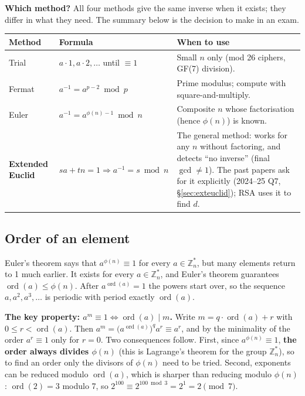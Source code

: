 \textbf{Which method?} All four methods give the same inverse when it exists; they differ in what they need. The summary below is the decision to make in an exam.
\begin{center}\small
\begin{tabularx}{\textwidth}{@{}l l X@{}}
\toprule
Method & Formula & When to use\\
\midrule
Trial & $a\cdot1, a\cdot2, \dots$ until $\equiv 1$ & Small $n$ only (mod 26 ciphers, GF(7) division).\\
Fermat & $a^{-1} = a^{p-2} \bmod p$ & Prime modulus; compute with square-and-multiply.\\
Euler & $a^{-1} = a^{\phi(n)-1} \bmod n$ & Composite $n$ whose factorisation (hence $\phi(n)$) is known.\\
\textbf{Extended Euclid} & $sa + tn = 1 \Rightarrow a^{-1} = s \bmod n$ & The general method: works for any $n$ without factoring, and detects ``no inverse'' (final $\gcd \ne 1$). The past papers ask for it explicitly (2024--25 Q7, \S\ref{sec:exteuclid}); RSA uses it to find $d$.\\
\bottomrule
\end{tabularx}
\end{center}

\subsection{Order of an element \new}
Euler's theorem says that $a^{\phi(n)} \equiv 1$ for every $a \in \mathbb{Z}_n^*$, but many elements return to 1 much earlier.  It exists for every $a \in \mathbb{Z}_n^*$, and Euler's theorem guarantees $\operatorname{ord}(a) \le \phi(n)$. After $a^{\operatorname{ord}(a)} = 1$ the powers start over, so the sequence $a, a^2, a^3, \dots$ is periodic with period exactly $\operatorname{ord}(a)$.

\textbf{The key property: $a^m \equiv 1 \iff \operatorname{ord}(a) \mid m$.} Write $m = q \cdot \operatorname{ord}(a) + r$ with $0 \le r < \operatorname{ord}(a)$. Then $a^m = \big(a^{\operatorname{ord}(a)}\big)^q a^r \equiv a^r$, and by the minimality of the order $a^r \equiv 1$ only for $r = 0$. Two consequences follow. First, since $a^{\phi(n)} \equiv 1$, \textbf{the order always divides $\phi(n)$} (this is Lagrange's theorem for the group $\mathbb{Z}_n^*$), so to find an order only the divisors of $\phi(n)$ need to be tried. Second, exponents can be reduced modulo $\operatorname{ord}(a)$, which is sharper than reducing modulo $\phi(n)$: $\operatorname{ord}(2) = 3$ modulo 7, so $2^{100} \equiv 2^{100 \bmod 3} = 2^1 = 2 \pmod 7$.

